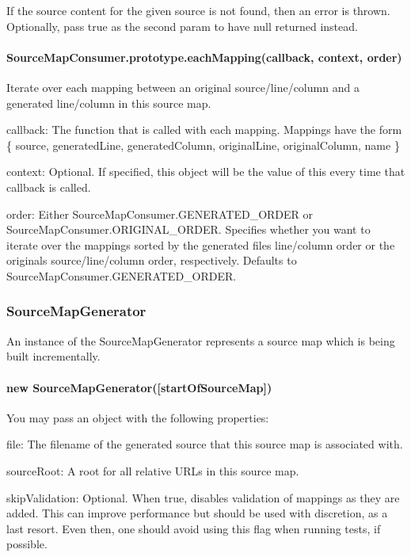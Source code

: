 If the source content for the given source is not found, then an error is thrown. Optionally, pass {\ttfamily true} as the second param to have {\ttfamily null} returned instead.

\paragraph*{Source\+Map\+Consumer.\+prototype.\+each\+Mapping(callback, context, order)}

Iterate over each mapping between an original source/line/column and a generated line/column in this source map.


\begin{DoxyItemize}
\item {\ttfamily callback}\+: The function that is called with each mapping. Mappings have the form {\ttfamily \{ source, generated\+Line, generated\+Column, original\+Line, original\+Column, name \}}
\item {\ttfamily context}\+: Optional. If specified, this object will be the value of {\ttfamily this} every time that {\ttfamily callback} is called.
\item {\ttfamily order}\+: Either {\ttfamily Source\+Map\+Consumer.\+G\+E\+N\+E\+R\+A\+T\+E\+D\+\_\+\+O\+R\+D\+ER} or {\ttfamily Source\+Map\+Consumer.\+O\+R\+I\+G\+I\+N\+A\+L\+\_\+\+O\+R\+D\+ER}. Specifies whether you want to iterate over the mappings sorted by the generated file\textquotesingle{}s line/column order or the original\textquotesingle{}s source/line/column order, respectively. Defaults to {\ttfamily Source\+Map\+Consumer.\+G\+E\+N\+E\+R\+A\+T\+E\+D\+\_\+\+O\+R\+D\+ER}.
\end{DoxyItemize}

\subsubsection*{Source\+Map\+Generator}

An instance of the Source\+Map\+Generator represents a source map which is being built incrementally.

\paragraph*{new Source\+Map\+Generator(\mbox{[}start\+Of\+Source\+Map\mbox{]})}

You may pass an object with the following properties\+:


\begin{DoxyItemize}
\item {\ttfamily file}\+: The filename of the generated source that this source map is associated with.
\item {\ttfamily source\+Root}\+: A root for all relative U\+R\+Ls in this source map.
\item {\ttfamily skip\+Validation}\+: Optional. When {\ttfamily true}, disables validation of mappings as they are added. This can improve performance but should be used with discretion, as a last resort. Even then, one should avoid using this flag when running tests, if possible.
\end{DoxyItemize}

